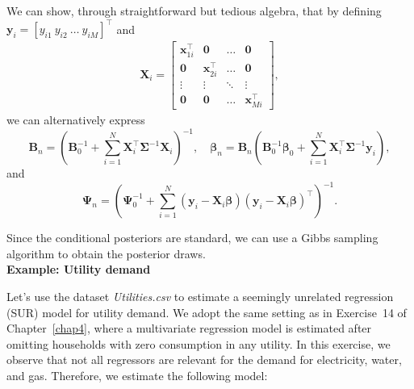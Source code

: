 We can show, through straightforward but tedious algebra, that by defining $\bm{y}_i = [y_{i1} \ y_{i2} \ \dots \ y_{iM}]^{\top}$ and
\begin{align*}
	\bm{X}_i =
	\begin{bmatrix}
		\mathbf{x}_{1i}^{\top} & \bm{0} & \dots & \bm{0} \\
		\bm{0} & \mathbf{x}_{2i}^{\top} & \dots & \bm{0} \\
		\vdots & \vdots & \ddots & \vdots \\
		\bm{0} & \bm{0} & \dots & \mathbf{x}_{Mi}^{\top}
	\end{bmatrix},
\end{align*}
we can alternatively express
\[
\bm{B}_n = \left(\bm{B}_0^{-1} + \sum_{i=1}^N \bm{X}_i^{\top} \bm{\Sigma}^{-1} \bm{X}_i \right)^{-1}, \quad
\bm{\beta}_n = \bm{B}_n \left(\bm{B}_0^{-1} \bm{\beta}_0 + \sum_{i=1}^N \bm{X}_i^{\top} \bm{\Sigma}^{-1} \bm{y}_i \right),
\]
and
\[
\bm{\Psi}_n = \left(\bm{\Psi}_0^{-1} + \sum_{i=1}^N (\bm{y}_i - \bm{X}_i\bm{\beta})(\bm{y}_i - \bm{X}_i\bm{\beta})^{\top}\right)^{-1}.
\]

Since the conditional posteriors are standard, we can use a Gibbs sampling algorithm to obtain the posterior draws.\\

\textbf{Example: Utility demand}

Let's use the dataset \textit{Utilities.csv} to estimate a seemingly unrelated regression (SUR) model for utility demand. We adopt the same setting as in Exercise~14 of Chapter~\ref{chap4}, where a multivariate regression model is estimated after omitting households with zero consumption in any utility. In this exercise, we observe that not all regressors are relevant for the demand for electricity, water, and gas. Therefore, we estimate the following model:

